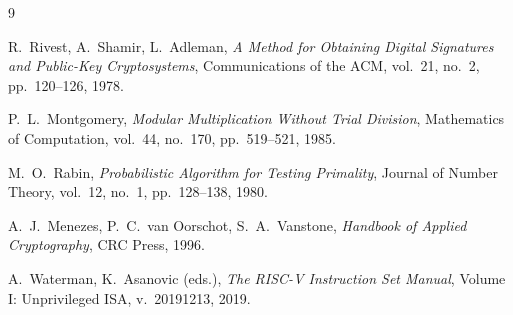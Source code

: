 \documentclass[12pt,a4paper]{report}
\begin{document}
\begin{thebibliography}{9}

R.~Rivest, A.~Shamir, L.~Adleman,
\textit{A Method for Obtaining Digital Signatures and Public-Key Cryptosystems},
Communications of the ACM, vol.~21, no.~2, pp.~120--126, 1978.

P.~L.~Montgomery,
\textit{Modular Multiplication Without Trial Division},
Mathematics of Computation, vol.~44, no.~170, pp.~519--521, 1985.

M.~O.~Rabin,
\textit{Probabilistic Algorithm for Testing Primality},
Journal of Number Theory, vol.~12, no.~1, pp.~128--138, 1980.

A.~J.~Menezes, P.~C.~van Oorschot, S.~A.~Vanstone,
\textit{Handbook of Applied Cryptography},
CRC Press, 1996.

A.~Waterman, K.~Asanovic (eds.),
\textit{The RISC-V Instruction Set Manual},
Volume I: Unprivileged ISA, v.~20191213, 2019.

\end{thebibliography}
\end{document}
